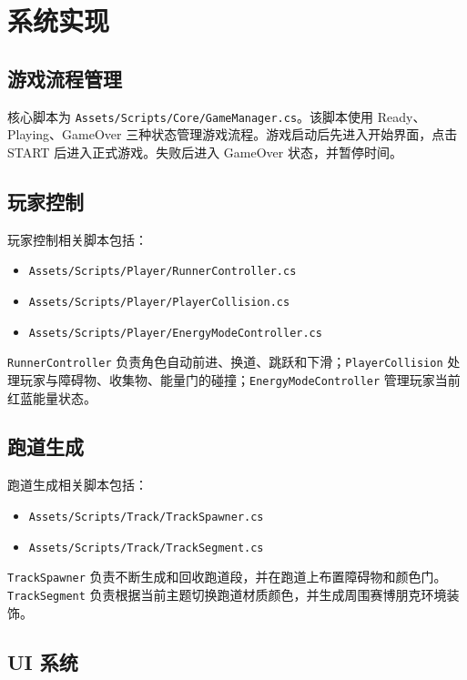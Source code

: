 \documentclass[UTF8,a4paper,12pt]{ctexart}
\begin{document}
\section{系统实现}

\subsection{游戏流程管理}

核心脚本为 \texttt{Assets/Scripts/Core/GameManager.cs}。该脚本使用 Ready、Playing、GameOver 三种状态管理游戏流程。游戏启动后先进入开始界面，点击 START 后进入正式游戏。失败后进入 GameOver 状态，并暂停时间。

\subsection{玩家控制}

玩家控制相关脚本包括：

\begin{itemize}
  \item \texttt{Assets/Scripts/Player/RunnerController.cs}
  \item \texttt{Assets/Scripts/Player/PlayerCollision.cs}
  \item \texttt{Assets/Scripts/Player/EnergyModeController.cs}
\end{itemize}

\texttt{RunnerController} 负责角色自动前进、换道、跳跃和下滑；\texttt{PlayerCollision} 处理玩家与障碍物、收集物、能量门的碰撞；\texttt{EnergyModeController} 管理玩家当前红蓝能量状态。

\subsection{跑道生成}

跑道生成相关脚本包括：

\begin{itemize}
  \item \texttt{Assets/Scripts/Track/TrackSpawner.cs}
  \item \texttt{Assets/Scripts/Track/TrackSegment.cs}
\end{itemize}

\texttt{TrackSpawner} 负责不断生成和回收跑道段，并在跑道上布置障碍物和颜色门。\texttt{TrackSegment} 负责根据当前主题切换跑道材质颜色，并生成周围赛博朋克环境装饰。

\subsection{UI 系统}
\end{document}
